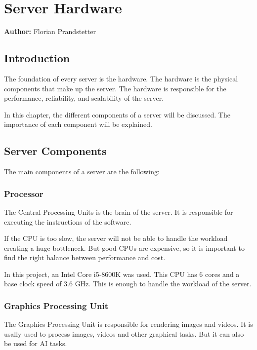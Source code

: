 \chapter{Server Hardware}
\label{chap:Server_Hardware}
\textbf{Author:} Florian Prandstetter


\section{Introduction}

The foundation of every server is the hardware. The hardware is the physical components that make up the server.
The hardware is responsible for the performance, reliability, and scalability of the server.

In this chapter, the different components of a server will be discussed. The importance of each component will be explained.


\section{Server Components}

The main components of a server are the following:

\subsection{Processor}

The Central Processing Units is the brain of the server. It is responsible for executing the instructions of the software. 

If the CPU is too slow, the server will not be able to handle the workload creating a huge bottleneck. But good CPUs are expensive, so it is important to find the right balance between performance and cost.

In this project, an Intel Core i5-8600K was used. This CPU has 6 cores and a base clock speed of 3.6 GHz. This is enough to handle the workload of the server.


\cite{CPU}
\cite{i5}

\subsection{Graphics Processing Unit}

The Graphics Processing Unit is responsible for rendering images and videos. It is usally used to process images, videos and other graphical tasks. But it can also be used for AI tasks.

